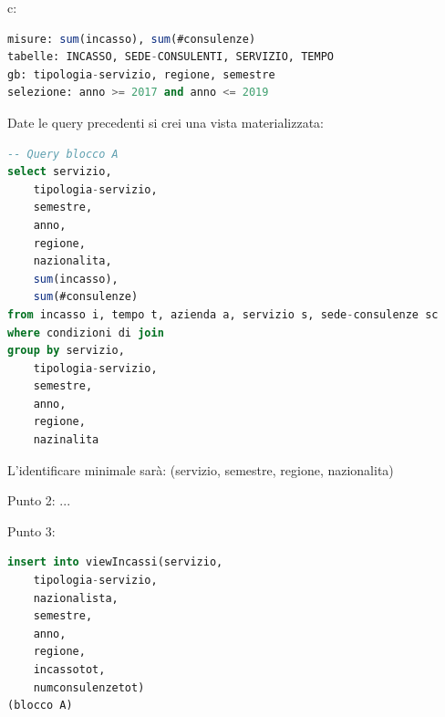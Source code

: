 \documentclass[12pt]{article}
\begin{document}
c:
\begin{lstlisting}[language=sql]
misure: sum(incasso), sum(#consulenze)
tabelle: INCASSO, SEDE-CONSULENTI, SERVIZIO, TEMPO
gb: tipologia-servizio, regione, semestre
selezione: anno >= 2017 and anno <= 2019
\end{lstlisting}

Date le query precedenti si crei una vista materializzata:
\begin{lstlisting}[language=sql]
-- Query blocco A
select servizio,
    tipologia-servizio,
    semestre,
    anno,
    regione,
    nazionalita,
    sum(incasso),
    sum(#consulenze)
from incasso i, tempo t, azienda a, servizio s, sede-consulenze sc
where condizioni di join
group by servizio,
    tipologia-servizio,
    semestre,
    anno,
    regione,
    nazinalita
\end{lstlisting}

L'identificare minimale sar\`a: (servizio, semestre, regione, nazionalita)

Punto 2:
...

Punto 3:
\begin{lstlisting}[language=sql]
insert into viewIncassi(servizio,
    tipologia-servizio,
    nazionalista,
    semestre,
    anno,
    regione,
    incassotot,
    numconsulenzetot)
(blocco A)
\end{lstlisting}
\end{document}
